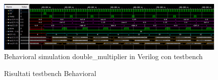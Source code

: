 \documentclass[]{IEEEtran}
\begin{document}
\begin{figure}[bt]
    \centering
    \includegraphics[width=\textwidth]{figures/sim_tb_bh}
    \caption{Behavioral simulation double\_multiplier in Verilog con testbench}
    \label{fig:SIM_TB_BH}
\end{figure}

\begin{figure}
    \centering
    \caption{Risultati testbench Behavioral}
    \label{fig:SIM_TB_BH_RES}
\end{figure}
\end{document}
